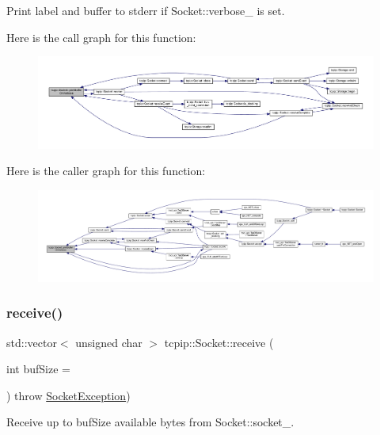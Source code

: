 Print {\ttfamily label} and {\ttfamily buffer} to stderr if Socket\+::verbose\+\_\+ is set. 

Here is the call graph for this function\+:\nopagebreak
\begin{figure}[H]
\begin{center}
\leavevmode
\includegraphics[width=350pt]{classtcpip_1_1_socket_a08e08cdc00fd69a51e2cdd8ecb22d1e0_cgraph}
\end{center}
\end{figure}
Here is the caller graph for this function\+:\nopagebreak
\begin{figure}[H]
\begin{center}
\leavevmode
\includegraphics[width=350pt]{classtcpip_1_1_socket_a08e08cdc00fd69a51e2cdd8ecb22d1e0_icgraph}
\end{center}
\end{figure}
\mbox{\label{classtcpip_1_1_socket_a1da162e961fee9f1a1450df9700fd468}} 
\subsubsection{\texorpdfstring{receive()}{receive()}}
{\footnotesize\ttfamily std\+::vector$<$ unsigned char $>$ tcpip\+::\+Socket\+::receive (\begin{DoxyParamCaption}\item[{int}]{buf\+Size = {} }\end{DoxyParamCaption}) throw  \hyperlink{classtcpip_1_1_socket_exception}{Socket\+Exception}) }



Receive up to {\ttfamily buf\+Size} available bytes from Socket\+::socket\+\_\+. 

